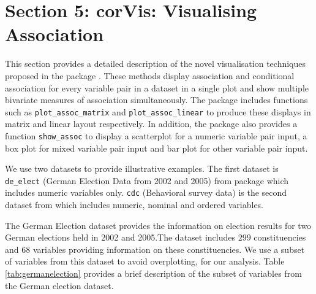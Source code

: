 \hypertarget{section-5-corvis-visualising-association}{%
\section{Section 5: corVis: Visualising
Association}\label{section-5-corvis-visualising-association}}

This section provides a detailed description of the novel visualisation
techniques proposed in the package . These methods
display association and conditional association for every variable pair
in a dataset in a single plot and show multiple bivariate measures of
association simultaneously. The package includes functions such as
\texttt{plot\_assoc\_matrix} and \texttt{plot\_assoc\_linear} to produce
these displays in matrix and linear layout respectively. In addition,
the package also provides a function \texttt{show\_assoc} to display a
scatterplot for a numeric variable pair input, a box plot for mixed
variable pair input and bar plot for other variable pair input.

We use two datasets to provide illustrative examples. The first dataset
is \texttt{de\_elect} (German Election Data from 2002 and 2005) from
 package which includes numeric variables only.
\texttt{cdc} (Behavioral survey data) is the second dataset from
\citet{diez2012openintro} which includes numeric, nominal and ordered
variables.

The German Election dataset provides the information on election results
for two German elections held in 2002 and 2005.The dataset includes
\(299\) constituencies and \(68\) variables providing information on
these constituencies. We use a subset of variables from this dataset to
avoid overplotting, for our analysis. Table \ref{tab:germanelection}
provides a brief description of the subset of variables from the German
election dataset.

